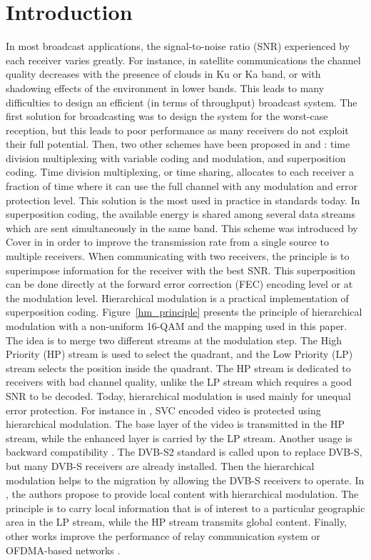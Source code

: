 \documentclass[conference, letterpaper]{IEEEtran}
\begin{document}
\section{Introduction}

In most broadcast applications, the signal-to-noise ratio (SNR) experienced by each receiver varies greatly. For instance, in satellite communications the channel quality decreases with the presence of clouds in Ku or Ka band, or with shadowing effects of the environment in lower bands. This leads to many difficulties to design an efficient (in terms of throughput) broadcast system. The first solution for broadcasting was to design the system for the worst-case reception, but this leads to poor performance as many receivers do not exploit their full potential. Then, two other schemes have been proposed in \cite{cover} and \cite{bergmans}: time division multiplexing with variable coding and modulation, and superposition coding. Time division multiplexing, or time sharing, allocates to each receiver a fraction of time where it can use the full channel with any modulation and error protection level. This solution is the most used in practice in standards today. In superposition coding, the available energy is shared among several data streams which are sent simultaneously in the same band. This scheme was introduced by Cover in \cite{cover} in order to improve the transmission rate from a single source to multiple receivers. When communicating with two receivers, the principle is to superimpose information for the receiver with the best SNR. This superposition can be done directly at the forward error correction (FEC) encoding level or at the modulation level. Hierarchical modulation is a practical implementation of superposition coding. Figure~\ref{hm_principle} presents the principle of hierarchical modulation with a non-uniform 16-QAM and the mapping used in this paper. The idea is to merge two different streams at the modulation step. The High Priority (HP) stream is used to select the quadrant, and the Low Priority (LP) stream selects the position inside the quadrant. The HP stream is dedicated to receivers with bad channel quality, unlike the LP stream which requires a good SNR to be decoded. Today, hierarchical modulation is used mainly for unequal error protection. For instance in \cite{svc_hm}, SVC encoded video \cite{svc} is protected using hierarchical modulation. The base layer of the video is transmitted in the HP stream, while the enhanced layer is carried by the LP stream. Another usage is backward compatibility \cite{backward_compatibility}. The DVB-S2 standard is called upon to replace DVB-S, but many DVB-S receivers are already installed. Then the hierarchical modulation helps to the migration by allowing the DVB-S receivers to operate. In \cite{local_content} , the authors propose to provide local content with hierarchical modulation. The principle is to carry local information that is of interest to a particular geographic area in the LP stream, while the HP stream transmits global content. Finally, other works  improve the performance of relay communication system \cite{relaycom} or OFDMA-based networks \cite{icc10}. 
\end{document}
